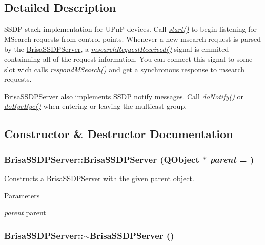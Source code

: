 \subsection{Detailed Description}
SSDP stack implementation for UPnP devices. Call {\itshape \hyperlink{classBrisaUpnp_1_1BrisaSSDPServer_a76ec5ae1f66a8ee27241c7b0a629d9a4}{start()}\/} to begin listening for MSearch requests from control points. Whenever a new msearch request is parsed by the \hyperlink{classBrisaUpnp_1_1BrisaSSDPServer}{BrisaSSDPServer}, a {\itshape \hyperlink{classBrisaUpnp_1_1BrisaSSDPServer_a81aff8b072c5fe63f1b3011c5084866a}{msearchRequestReceived()}\/} signal is emmited containning all of the request information. You can connect this signal to some slot wich calls {\itshape \hyperlink{classBrisaUpnp_1_1BrisaSSDPServer_abd6220bed881e7e33c6e49a84388996a}{respondMSearch()}\/} and get a synchronous response to msearch requests.

\hyperlink{classBrisaUpnp_1_1BrisaSSDPServer}{BrisaSSDPServer} also implements SSDP notify messages. Call {\itshape \hyperlink{classBrisaUpnp_1_1BrisaSSDPServer_ac1ea6c85983ed106c4dee300e7500b74}{doNotify()}\/} or {\itshape \hyperlink{classBrisaUpnp_1_1BrisaSSDPServer_afe21b672caca021dbed29b7e0e7a9744}{doByeBye()}\/} when entering or leaving the multicast group. 

\subsection{Constructor \& Destructor Documentation}
\hypertarget{classBrisaUpnp_1_1BrisaSSDPServer_aab381a208bb65f63e4e10f6c4e5429b9}{
\subsubsection[{BrisaSSDPServer}]{\setlength{\rightskip}{0pt plus 5cm}BrisaSSDPServer::BrisaSSDPServer (QObject $\ast$ {\em parent} = {})}}
\label{classBrisaUpnp_1_1BrisaSSDPServer_aab381a208bb65f63e4e10f6c4e5429b9}


Constructs a \hyperlink{classBrisaUpnp_1_1BrisaSSDPServer}{BrisaSSDPServer} with the given parent object. 
\begin{DoxyParams}{Parameters}
\item[{\em parent}]parent \end{DoxyParams}
\hypertarget{classBrisaUpnp_1_1BrisaSSDPServer_adc16bda24aefcfddada56fedd69483f6}{
\subsubsection[{$\sim$BrisaSSDPServer}]{\setlength{\rightskip}{0pt plus 5cm}BrisaSSDPServer::$\sim$BrisaSSDPServer ()}}
\label{classBrisaUpnp_1_1BrisaSSDPServer_adc16bda24aefcfddada56fedd69483f6}


